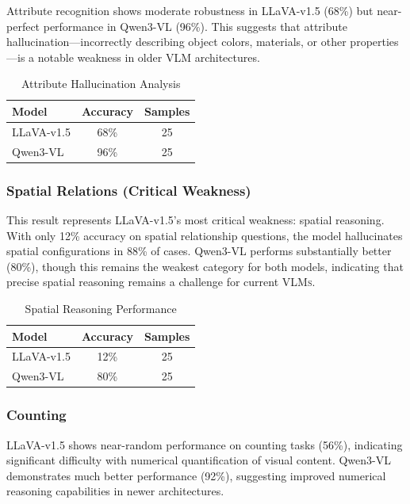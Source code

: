 \documentclass[11pt,a4paper]{article}
\newcommand{\VLMs}{\textsc{VLMs}}
\begin{document}
Attribute recognition shows moderate robustness in LLaVA-v1.5 (68\%) but near-perfect performance in Qwen3-VL (96\%). This suggests that attribute hallucination---incorrectly describing object colors, materials, or other properties---is a notable weakness in older VLM architectures.

\vspace{10pt}
\begin{table}[h]
\centering
\begin{tabular}{lcc}
\toprule
\textbf{Model} & \textbf{Accuracy} & \textbf{Samples} \\
\midrule
LLaVA-v1.5 & 68\% & 25 \\
Qwen3-VL & 96\% & 25 \\
\bottomrule
\end{tabular}
\caption{Attribute Hallucination Analysis}
\end{table}

\subsubsection{Spatial Relations (Critical Weakness)}

This result represents LLaVA-v1.5's most critical weakness: spatial reasoning. With only 12\% accuracy on spatial relationship questions, the model hallucinates spatial configurations in 88\% of cases. Qwen3-VL performs substantially better (80\%), though this remains the weakest category for both models, indicating that precise spatial reasoning remains a challenge for current \VLMs.

\begin{table}[h]
\centering
\begin{tabular}{lcc}
\toprule
\textbf{Model} & \textbf{Accuracy} & \textbf{Samples} \\
\midrule
LLaVA-v1.5 & 12\% & 25 \\
Qwen3-VL & 80\% & 25 \\
\bottomrule
\end{tabular}
\caption{Spatial Reasoning Performance}
\end{table}

\subsubsection{Counting}

LLaVA-v1.5 shows near-random performance on counting tasks (56\%), indicating significant difficulty with numerical quantification of visual content. Qwen3-VL demonstrates much better performance (92\%), suggesting improved numerical reasoning capabilities in newer architectures.
\end{document}
